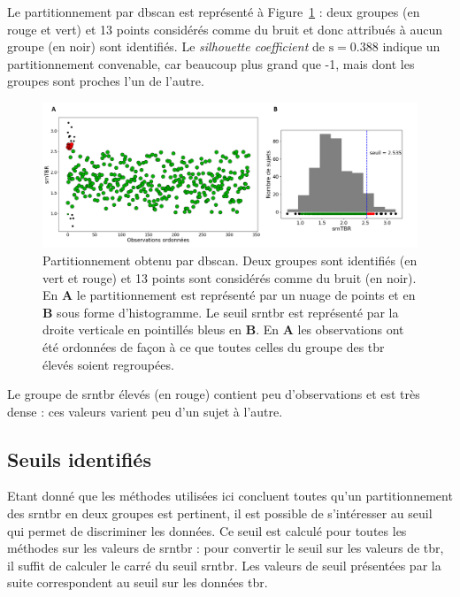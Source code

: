 Le partitionnement par \gls{dbscan} est représenté à Figure~\ref{Figure:tbr_dbscan_clustering_plot} : deux groupes (en rouge et vert) et 13 
points considérés comme du bruit et donc attribués à aucun groupe (en noir) sont identifiés. Le \textit{silhouette coefficient} de $\text{s} = 0.388$
indique un partitionnement convenable, car beaucoup plus grand que -1, mais dont les groupes sont proches l'un de l'autre. 

\begin{figure}[h!]
  \centering
	\includegraphics[width=1.0\linewidth]{figures/chapter-4/tbr-dbscan-clustering-plot} 
  \caption[Partitionnement obtenu par \gls{dbscan}.]{Partitionnement obtenu par \gls{dbscan}. Deux groupes sont identifiés (en vert et rouge) et 13 points sont considérés comme du bruit (en noir).
	En \textbf{A} le partitionnement est représenté par un nuage de points et en \textbf{B} sous forme d'histogramme. Le seuil \gls{srntbr} est représenté par 
	la droite verticale en pointillés bleus en \textbf{B}. En \textbf{A} les observations ont été ordonnées de façon à ce que toutes celles du groupe des \gls{tbr} élevés 
	soient regroupées.}
  \label{Figure:tbr_dbscan_clustering_plot}
\end{figure}

Le groupe de \gls{srntbr} élevés (en rouge) contient peu d'observations et est très dense : ces valeurs varient peu d'un sujet à l'autre.


\subsection{Seuils identifiés}
Etant donné que les méthodes utilisées ici concluent toutes qu'un partitionnement des \gls{srntbr} en deux groupes est pertinent, il est possible de s'intéresser
au seuil qui permet de discriminer les données. Ce seuil est calculé pour toutes les méthodes sur les valeurs de \gls{srntbr} : pour convertir le seuil sur 
les valeurs de \gls {tbr}, il suffit de calculer le carré du seuil \gls{srntbr}. Les valeurs de seuil présentées par la suite correspondent au seuil
sur les données \gls{tbr}.

